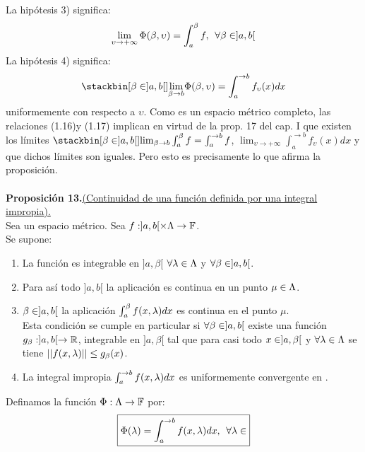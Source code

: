 La hipótesis 3) significa: 
\begin{equation}
\lim_{\upsilon \to +\infty}\Phi (\beta,\upsilon)=\int_a^\beta f, \phantom{s} \forall \beta \in ]a,b[
\end{equation}
La hipótesis 4) significa:
\begin{equation}
\stackbin[\beta \en ]a,b[]{}{\lim_{\beta \to b}}\Phi (\beta, \upsilon)=\int_a^{\to b}f_\upsilon(x)dx
\end{equation}
uniformemente con respecto a $\upsilon$.
Como \F \phantom{} es un espacio métrico completo, las relaciones (1.16)y (1.17) implican en virtud de la prop. 17 del cap. $\mathrm{I}$ que existen los límites $\stackbin[\beta \en ]a,b[]{}{\lim_{\beta \to b}}\int_a^\beta f=\int_a^{\to b}f$, $\lim_{\upsilon \to +\infty}\int_a^{\to b}f_\upsilon(x)dx$ y que dichos límites son iguales. Pero esto es precisamente lo que afirma la proposición. \\ \\
\textbf{Proposición 13.}\underline{(Continuidad de una función definida por una integral impropia).}\\
Sea \Lam \phantom{} un espacio métrico. Sea $f:]a,b[ \times \Lambda \rightarrow \mathbb{F}$.\\
Se supone:\\
\begin{enumerate}[1)]
\item La función \x \flecha \fxla \phantom{} es integrable en $]a,\beta[$ $\forall \lambda \in \Lambda$ y $\forall \beta \in ]a,b[$.\\
\item Para así todo \x \en $]a,b[$ la aplicación \lam \flecha \fxla \phantom{} es continua en un punto $\mu \in \Lambda$.
\item \todo $\beta  \in ]a,b[$ la aplicación \lam \flecha $\int _a^{\beta} f(x,\lambda) dx$ es continua en el punto $\mu$.\\
Esta condición se cumple en particular si $\forall \beta \in ]a,b[$ existe una función $g_\beta:]a,b[ \rightarrow \mathbb{R}$, integrable en $]a,\beta[$ tal que para casi todo $x \in ]a,\beta[$ y $\forall \lambda \in \Lambda$ se tiene $|| f(x,\lambda) || \leq g_\beta (x)$. 
\item La integral impropia $\int_a^{\to b}f(x,\lambda) dx$ es uniformemente convergente en \Lam .\\
\end{enumerate}
Definamos la función $\Phi: \Lambda \rightarrow \mathbb{F}$ por:
\begin{equation*}
\boxed{\Phi (\lambda)=\int_a^{\to b}f(x,\lambda) dx, \phantom{s} \forall \lambda \in }
\end{equation*}
